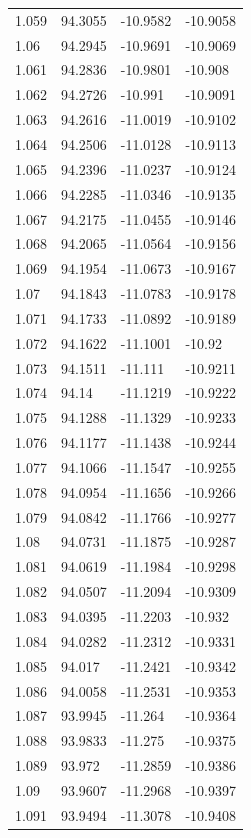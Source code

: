 \begin{tabular}{llll}
1.059 & 94.3055 & -10.9582 & -10.9058 \\
1.06 & 94.2945 & -10.9691 & -10.9069 \\
1.061 & 94.2836 & -10.9801 & -10.908 \\
1.062 & 94.2726 & -10.991 & -10.9091 \\
1.063 & 94.2616 & -11.0019 & -10.9102 \\
1.064 & 94.2506 & -11.0128 & -10.9113 \\
1.065 & 94.2396 & -11.0237 & -10.9124 \\
1.066 & 94.2285 & -11.0346 & -10.9135 \\
1.067 & 94.2175 & -11.0455 & -10.9146 \\
1.068 & 94.2065 & -11.0564 & -10.9156 \\
1.069 & 94.1954 & -11.0673 & -10.9167 \\
1.07 & 94.1843 & -11.0783 & -10.9178 \\
1.071 & 94.1733 & -11.0892 & -10.9189 \\
1.072 & 94.1622 & -11.1001 & -10.92 \\
1.073 & 94.1511 & -11.111 & -10.9211 \\
1.074 & 94.14 & -11.1219 & -10.9222 \\
1.075 & 94.1288 & -11.1329 & -10.9233 \\
1.076 & 94.1177 & -11.1438 & -10.9244 \\
1.077 & 94.1066 & -11.1547 & -10.9255 \\
1.078 & 94.0954 & -11.1656 & -10.9266 \\
1.079 & 94.0842 & -11.1766 & -10.9277 \\
1.08 & 94.0731 & -11.1875 & -10.9287 \\
1.081 & 94.0619 & -11.1984 & -10.9298 \\
1.082 & 94.0507 & -11.2094 & -10.9309 \\
1.083 & 94.0395 & -11.2203 & -10.932 \\
1.084 & 94.0282 & -11.2312 & -10.9331 \\
1.085 & 94.017 & -11.2421 & -10.9342 \\
1.086 & 94.0058 & -11.2531 & -10.9353 \\
1.087 & 93.9945 & -11.264 & -10.9364 \\
1.088 & 93.9833 & -11.275 & -10.9375 \\
1.089 & 93.972 & -11.2859 & -10.9386 \\
1.09 & 93.9607 & -11.2968 & -10.9397 \\
1.091 & 93.9494 & -11.3078 & -10.9408 \\

\end{tabular}
